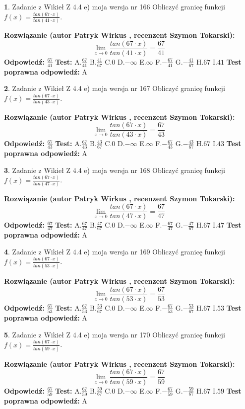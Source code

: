 \documentclass[12pt, a4paper]{article}
\theoremstyle{definition} %
\newtheorem{zad}{}
\newcommand{\zadStart}[1]{\begin{zad}#1\newline}
\newcommand{\zadStop}{\end{zad}}
\newcommand{\rozwStart}[2]{\noindent \textbf{Rozwiązanie (autor #1 , recenzent #2): }\newline}
\newcommand{\rozwStop}{\newline}
\newcommand{\odpStart}{\noindent \textbf{Odpowiedź:}\newline}
\newcommand{\odpStop}{\newline}
\newcommand{\testStart}{\noindent \textbf{Test:}\newline}
\newcommand{\testStop}{\newline}
\newcommand{\kluczStart}{\noindent \textbf{Test poprawna odpowiedź:}\newline}
\newcommand{\kluczStop}{\newline}
\begin{document}
\zadStart{Zadanie z Wikieł Z 4.4 e) moja wersja nr 166}
Obliczyć granicę funkcji $f(x)=\frac{tan(67\cdot x)}{tan(41\cdot x)}$.
\zadStop
\rozwStart{Patryk Wirkus}{Szymon Tokarski}
$$\lim\limits_{x\to 0}\frac{tan(67\cdot x)}{tan(41\cdot x)}=
\frac{67}{41}$$
\rozwStop
\odpStart
$\frac{67}{41}$
\odpStop
\testStart
A.$\frac{67}{41}$
B.$\frac{41}{67}$
C.$0$
D.$-\infty$
E.$\infty$
F.$-\frac{67}{41}$
G.$-\frac{41}{67}$
H.$67$
I.$41$
\testStop
\kluczStart
A
\kluczStop



\zadStart{Zadanie z Wikieł Z 4.4 e) moja wersja nr 167}
Obliczyć granicę funkcji $f(x)=\frac{tan(67\cdot x)}{tan(43\cdot x)}$.
\zadStop
\rozwStart{Patryk Wirkus}{Szymon Tokarski}
$$\lim\limits_{x\to 0}\frac{tan(67\cdot x)}{tan(43\cdot x)}=
\frac{67}{43}$$
\rozwStop
\odpStart
$\frac{67}{43}$
\odpStop
\testStart
A.$\frac{67}{43}$
B.$\frac{43}{67}$
C.$0$
D.$-\infty$
E.$\infty$
F.$-\frac{67}{43}$
G.$-\frac{43}{67}$
H.$67$
I.$43$
\testStop
\kluczStart
A
\kluczStop



\zadStart{Zadanie z Wikieł Z 4.4 e) moja wersja nr 168}
Obliczyć granicę funkcji $f(x)=\frac{tan(67\cdot x)}{tan(47\cdot x)}$.
\zadStop
\rozwStart{Patryk Wirkus}{Szymon Tokarski}
$$\lim\limits_{x\to 0}\frac{tan(67\cdot x)}{tan(47\cdot x)}=
\frac{67}{47}$$
\rozwStop
\odpStart
$\frac{67}{47}$
\odpStop
\testStart
A.$\frac{67}{47}$
B.$\frac{47}{67}$
C.$0$
D.$-\infty$
E.$\infty$
F.$-\frac{67}{47}$
G.$-\frac{47}{67}$
H.$67$
I.$47$
\testStop
\kluczStart
A
\kluczStop



\zadStart{Zadanie z Wikieł Z 4.4 e) moja wersja nr 169}
Obliczyć granicę funkcji $f(x)=\frac{tan(67\cdot x)}{tan(53\cdot x)}$.
\zadStop
\rozwStart{Patryk Wirkus}{Szymon Tokarski}
$$\lim\limits_{x\to 0}\frac{tan(67\cdot x)}{tan(53\cdot x)}=
\frac{67}{53}$$
\rozwStop
\odpStart
$\frac{67}{53}$
\odpStop
\testStart
A.$\frac{67}{53}$
B.$\frac{53}{67}$
C.$0$
D.$-\infty$
E.$\infty$
F.$-\frac{67}{53}$
G.$-\frac{53}{67}$
H.$67$
I.$53$
\testStop
\kluczStart
A
\kluczStop



\zadStart{Zadanie z Wikieł Z 4.4 e) moja wersja nr 170}
Obliczyć granicę funkcji $f(x)=\frac{tan(67\cdot x)}{tan(59\cdot x)}$.
\zadStop
\rozwStart{Patryk Wirkus}{Szymon Tokarski}
$$\lim\limits_{x\to 0}\frac{tan(67\cdot x)}{tan(59\cdot x)}=
\frac{67}{59}$$
\rozwStop
\odpStart
$\frac{67}{59}$
\odpStop
\testStart
A.$\frac{67}{59}$
B.$\frac{59}{67}$
C.$0$
D.$-\infty$
E.$\infty$
F.$-\frac{67}{59}$
G.$-\frac{59}{67}$
H.$67$
I.$59$
\testStop
\kluczStart
A
\kluczStop
\end{document}

